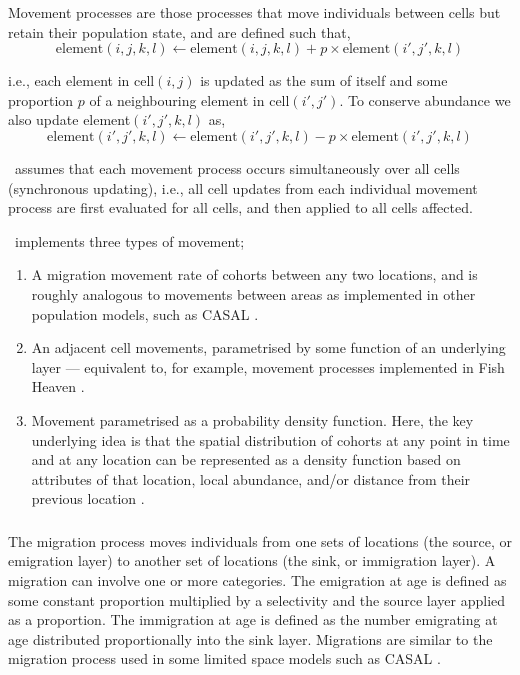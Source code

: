Movement processes are those processes that move individuals between cells but retain their population state, and are defined such that,
\begin{equation}
\text{element}(i,j,k,l)\leftarrow \text{element}(i,j,k,l) + p \times \text{element}(i',j',k,l)
\end{equation}

i.e., each element in cell$(i,j)$ is updated as the sum of itself and some proportion $p$ of a neighbouring element in cell$(i',j')$. To conserve abundance we also update element$(i',j',k,l)$ as,
\begin{equation}
\text{element}(i',j',k,l)\leftarrow \text{element}(i',j',k,l) - p\times \text{element}(i',j',k,l)
\end{equation}

\SPM\ assumes that each movement process occurs simultaneously over all cells (synchronous updating), i.e., all cell updates from each individual movement process are first evaluated for all cells, and then applied to all cells affected. 

\SPM\ implements three types of movement;
\begin{enumerate}
	\item  A migration movement rate of cohorts between any two locations, and is roughly analogous to movements between areas as implemented in other population models, such as CASAL \citep{1388}.
	\item An adjacent cell movements, parametrised by some function of an underlying layer --- equivalent to, for example, movement processes implemented in Fish Heaven \citep{1136,1135}. 
	\item Movement parametrised as a probability density function. Here, the key underlying idea is that the spatial distribution of cohorts at any point in time and at any location can be represented as a density function based on attributes of that location, local abundance, and/or distance from their previous location \citep{1366,1367}. 
\end{enumerate}

\subsubsection{}

The migration process moves individuals from one sets of locations (the source, or emigration layer) to another set of locations (the sink, or immigration layer). A migration can involve one or more categories. The emigration at age is defined as some constant proportion multiplied by a selectivity and the source layer applied as a proportion. The immigration at age is defined as the number emigrating at age distributed proportionally into the sink layer. Migrations are similar to the migration process used in some limited space models such as CASAL \citep{1388}.

